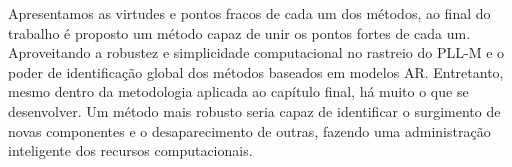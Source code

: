 Apresentamos as virtudes e pontos fracos de cada um dos métodos, ao final do trabalho é proposto um método capaz de unir os pontos fortes de cada um. Aproveitando a robustez e simplicidade computacional no rastreio do PLL-M e o poder de identificação global dos métodos baseados em modelos AR. Entretanto, mesmo dentro da metodologia aplicada ao capítulo final, há muito o que se desenvolver. Um método mais robusto seria capaz de identificar o surgimento de novas componentes e o desaparecimento de outras, fazendo uma administração inteligente dos recursos computacionais. 
